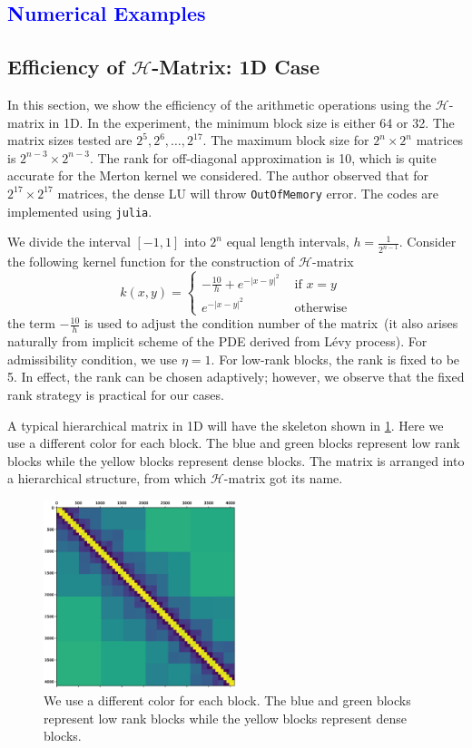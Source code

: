 \documentclass[10pt,a4paper]{article}
\newcommand{\lib}[1]{\textcolor{blue}{\section{#1}}}
\theoremstyle{definition}
\begin{document}
\lib{Numerical Examples}


\subsection{Efficiency of $\mathcal{H}$-Matrix: 1D Case}

In this section, we show the efficiency of the arithmetic operations using the $\mathcal{H}$-matrix in 1D. In the experiment, the minimum block size is either 64 or 32. The matrix sizes tested are $2^5, 2^6, \ldots, 2^{17}$. The maximum block size for $2^n\times 2^n$ matrices is $2^{n-3}\times 2^{n-3}$. The rank for off-diagonal approximation is 10, which is quite accurate for the Merton kernel we considered. The author observed that for $2^{17}\times 2^{17}$ matrices, the dense LU will throw \texttt{OutOfMemory} error. The codes are implemented using \texttt{julia}. 


We divide the interval $[-1,1]$ into $2^n$ equal length intervals, $h=\frac{1}{2^{n-1}}$. Consider the following kernel function for the construction of $\mathcal{H}$-matrix
\begin{equation}
	k(x,y) = \begin{cases}
		-\frac{10}{h} + e^{-|x-y|^2} & \mbox{ if } x=y\\
		e^{-|x-y|^2} & \mbox{ otherwise}
	\end{cases}
\end{equation}
the term $-\frac{10}{h}$ is used to adjust the condition number of the matrix~(it also arises naturally from implicit scheme of the PDE derived from L\'evy process). For admissibility condition,  we use $\eta=1$. For low-rank blocks, the rank is fixed to be 5. In effect, the rank can be chosen adaptively; however, we observe that the fixed rank strategy is practical for our cases. 

A typical hierarchical matrix in 1D will have the skeleton shown in \cref{fig:1D}. Here we use a different color for each block. The blue and green blocks represent low rank blocks while the yellow blocks represent dense blocks. The matrix is arranged into a hierarchical structure, from which $\mathcal{H}$-matrix got its name. 

\begin{figure}[H] %
\centering
\includegraphics[width=0.5\textwidth,keepaspectratio]{figures/1D}
\caption{We use a different color for each block. The blue and green blocks represent low rank blocks while the yellow blocks represent dense blocks.}
\label{fig:1D}
\end{figure} 
\end{document}
